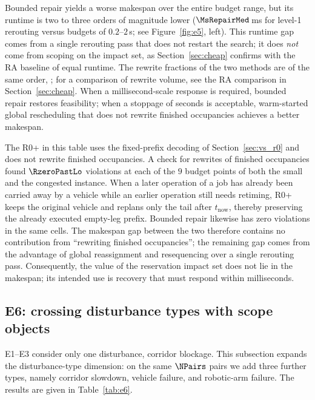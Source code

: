 Bounded repair yields a worse makespan over the entire budget range, but its runtime is two to three orders of magnitude lower (\(\MsRepairMed\)\,ms for level-1 rerouting
versus budgets of \(0.2\)--\(2\)\,s; see Figure~\ref{fig:e5}, left). This runtime gap comes from a single rerouting pass that does not restart the search;
it does \emph{not} come from scoping on the impact set, as Section~\ref{sec:cheap} confirms with the RA baseline of equal runtime.
The rewrite fractions of the two methods are of the same order, \ResFracRtwo; for a comparison of rewrite volume, see the RA comparison in Section~\ref{sec:cheap}.
When a millisecond-scale response is required, bounded repair restores feasibility; when a stoppage of seconds is acceptable, warm-started global rescheduling that does not rewrite finished occupancies achieves a better makespan.

The R0+ in this table uses the fixed-prefix decoding of Section~\ref{sec:vs_r0} and does not rewrite finished occupancies.
A check for rewrites of finished occupancies found \(\RzeroPastLo\) violations at each of the \(9\) budget points of both the small and the congested instance.
When a later operation of a job has already been carried away by a vehicle while an earlier operation still needs retiming, R0+ keeps the original vehicle and replans only the tail after \(t_{\mathrm{now}}\),
thereby preserving the already executed empty-leg prefix. Bounded repair likewise has zero violations in the same cells.
The makespan gap between the two therefore contains no contribution from ``rewriting finished occupancies'';
the remaining gap comes from the advantage of global reassignment and resequencing over a single rerouting pass.
Consequently, the value of the reservation impact set does not lie in the makespan; its intended use is recovery that must respond within milliseconds.

\subsection{E6: crossing disturbance types with scope objects}
\label{sec:e6}

E1--E3 consider only one disturbance, corridor blockage. This subsection expands the disturbance-type dimension: on the same \(\NPairs\) pairs we add
three further types, namely corridor slowdown, vehicle failure, and robotic-arm failure. The results are given in Table~\ref{tab:e6}.

